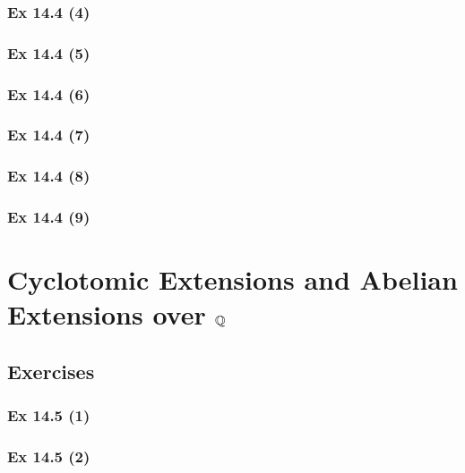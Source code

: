 \subsubsection{Ex 14.4 (4)}\label{sec:Ex_14.4.4}

\subsubsection{Ex 14.4 (5)}\label{sec:Ex_14.4.5}

\subsubsection{Ex 14.4 (6)}\label{sec:Ex_14.4.6}

\subsubsection{Ex 14.4 (7)}\label{sec:Ex_14.4.7}

\subsubsection{Ex 14.4 (8)}\label{sec:Ex_14.4.8}

\subsubsection{Ex 14.4 (9)}\label{sec:Ex_14.4.9}

\newpage		%

\section{Cyclotomic Extensions and Abelian\\ Extensions over $\mathbb{Q}$}\label{sec:14.5}	
\subsection*{Exercises}\label{sec:14.5_Exercises}

\subsubsection{Ex 14.5 (1)}\label{sec:Ex_14.5.1}

\subsubsection{Ex 14.5 (2)}\label{sec:Ex_14.5.2}

